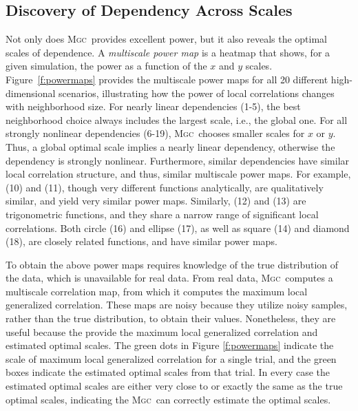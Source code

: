 \documentclass[11pt]{article}
\providecommand{\sct}[1]{{\normalfont\textsc{#1}}}
\newcommand{\Mgc}{\sct{Mgc}}
\begin{document}
\subsection*{Discovery of Dependency Across Scales}
\label{main3}

Not only does \Mgc~provides excellent power, but it also reveals the optimal scales of dependence. 
A \emph{multiscale power map} is a heatmap that shows, for a given simulation, the power as a function of the $x$ and $y$ scales.  
Figure~\ref{f:powermaps} provides the multiscale power maps for all 20 different high-dimensional scenarios, illustrating how the power of local correlations changes with  neighborhood size.
For nearly linear dependencies (1-5), the best neighborhood choice always includes the largest scale, i.e., the global one. For all strongly nonlinear dependencies (6-19),  \Mgc~chooses smaller scales for $x$ or $y$. Thus, a global optimal scale implies a nearly linear dependency, otherwise the dependency is strongly nonlinear.
Furthermore, similar dependencies have similar local correlation structure, and thus, similar multiscale power maps. For example, (10) and (11), though very different functions analytically, are qualitatively similar, and yield very similar power maps.
Similarly,  (12) and (13) are trigonometric functions, and they share a narrow range of significant local correlations.
Both circle (16) and ellipse (17), as well as square (14) and diamond (18), are closely related functions, and have similar  power maps. 

To obtain the above power maps requires knowledge of the true distribution of the data, which is unavailable for real data.  From real data, \Mgc~computes a multiscale correlation map, from which it computes the maximum local generalized correlation.  These maps are noisy because they utilize noisy samples, rather than the true distribution, to obtain their values.  Nonetheless, they are useful because the provide the maximum local generalized correlation and estimated optimal scales.  The green dots in Figure \ref{f:powermaps} indicate the scale of maximum local generalized correlation for a single trial, and the green boxes indicate the estimated optimal scales from that trial.  In every case the estimated optimal scales are either very close to or exactly the same as the true optimal scales, indicating the \Mgc~can correctly estimate the optimal scales.  


\end{document}
